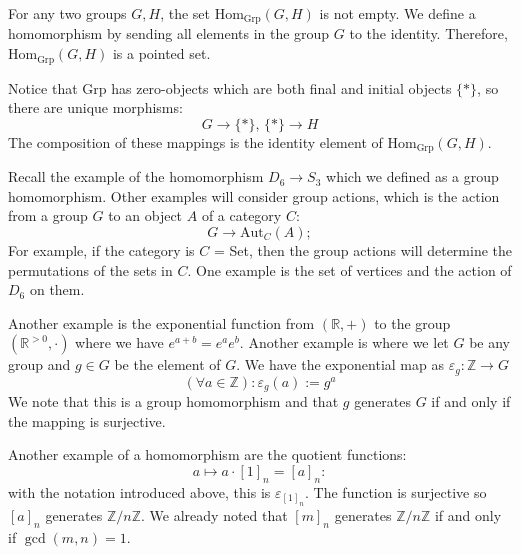 \documentclass{report}
\begin{document}
\begin{examples}
    \begin{example}[\label{exm:2.4.1}]
        For any two groups $G, H$, the set $\text{Hom}_{\text{Grp}}(G, H)$ is not empty. We define a homomorphism by sending all elements in the group $G$ to the identity. Therefore, $\text{Hom}_{\text{Grp}}(G, H)$ is a pointed set.

        Notice that $\text{Grp}$ has zero-objects which are both final and initial objects $\{*\}$, so there are unique morphisms:
            \begin{equation*}
                G \rightarrow \{*\}, \, \{*\} \rightarrow H
            \end{equation*}
        The composition of these mappings is the identity element of $\text{Hom}_{\text{Grp}}(G, H)$.
    \end{example}
\end{examples}

Recall the example of the homomorphism $D_{6} \rightarrow S_{3}$ which we defined as a group homomorphism. Other examples will consider group actions, which is the action from a group $G$ to an object $A$ of a category $C$:
    \begin{equation*}
        G \rightarrow \text{Aut}_{C}(A);
    \end{equation*}
For example, if the category is $C$ = Set, then the group actions will determine the permutations of the sets in $C$. One example is the set of vertices and the action of $D_{6}$ on them.

Another example is the exponential function from $(\mathbb{R}, +)$ to the group $(\mathbb{R}^{> 0}, \cdot )$ where we have $e^{a + b} = e^{a}e^{b}$. Another example is where we let $G$ be any group and $g \in G$ be the element of $G$. We have the exponential map as $\varepsilon_{g} : \mathbb{Z} \rightarrow G$
    \begin{equation*}
        (\forall a \in \mathbb{Z}) : \varepsilon_{g}(a) := g^{a}
    \end{equation*}
We note that this is a group homomorphism and that $g$ generates $G$ if and only if the mapping is surjective.

Another example of a homomorphism are the quotient functions:
    \begin{equation*}
        a \mapsto a \cdot [1]_{n} = [a]_{n}:
    \end{equation*}
with the notation introduced above, this is $\varepsilon_{[1]_{n}}$. The function is surjective so $[a]_{n}$ generates $\mathbb{Z}/n\mathbb{Z}$. We already noted that $[m]_{n}$ generates $\mathbb{Z}/n\mathbb{Z}$ if and only if $\gcd(m, n) = 1$.
\end{document}
